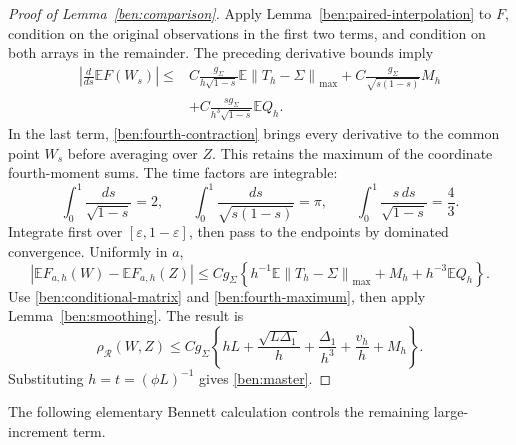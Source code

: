 \documentclass[11pt,letterpaper]{article}
\newenvironment{recovered}{}{}
\newenvironment{vSixBlock}{\color{magenta}}{}
\theoremstyle{remark}
\newcommand{\E}{\mathbb E}
\newcommand{\norm}[1]{\left\lVert#1\right\rVert}
\newcommand{\rh}{\rho_{\mathcal R}}
\begin{document}
\begin{recovered}
\begin{proof}[Proof of Lemma~\ref{ben:comparison}]
\begin{vSixBlock}
Apply Lemma~\ref{ben:paired-interpolation} to \(F\), condition on
the original observations in the first two terms, and condition on
both arrays in the remainder. The preceding derivative bounds imply
\begin{align*}
 \left|\frac d{ds}\E F(W_s)\right|
 \le{}&C\frac{g_\Sigma}{h\sqrt{1-s}}
                \E\norm{T_h-\Sigma}_{\max}
       +C\frac{g_\Sigma}{\sqrt{s(1-s)}}M_h\\
 &+C\frac{sg_\Sigma}{h^3\sqrt{1-s}}\E Q_h.
\end{align*}
In the last term, \eqref{ben:fourth-contraction} brings every
derivative to the common point \(W_s\) before averaging over \(Z\).
This retains the maximum of the coordinate fourth-moment sums.
The time factors are integrable:
\[
 \int_0^1\frac{ds}{\sqrt{1-s}}=2,\qquad
 \int_0^1\frac{ds}{\sqrt{s(1-s)}}=\pi,\qquad
 \int_0^1\frac{s\,ds}{\sqrt{1-s}}=\frac43.
\]
Integrate first over \([\varepsilon,1-\varepsilon]\), then pass
to the endpoints by dominated convergence. Uniformly in \(a\),
\[
 |\E F_{a,h}(W)-\E F_{a,h}(Z)|
 \le Cg_\Sigma\left\{
 h^{-1}\E\norm{T_h-\Sigma}_{\max}+M_h+h^{-3}\E Q_h\right\}.
\]
Use \eqref{ben:conditional-matrix} and \eqref{ben:fourth-maximum},
then apply Lemma~\ref{ben:smoothing}. The result is
\[
 \rh(W,Z)\le Cg_\Sigma\left\{
 hL+\frac{\sqrt{L\Delta_1}}h
 +\frac{\Delta_1}{h^3}+\frac{v_h}h+M_h\right\}.
\]
Substituting \(h=t=(\phi L)^{-1}\) gives \eqref{ben:master}.
\end{vSixBlock}
\end{proof}
\end{recovered}


The following elementary Bennett calculation controls the remaining
large-increment term.
\end{document}
